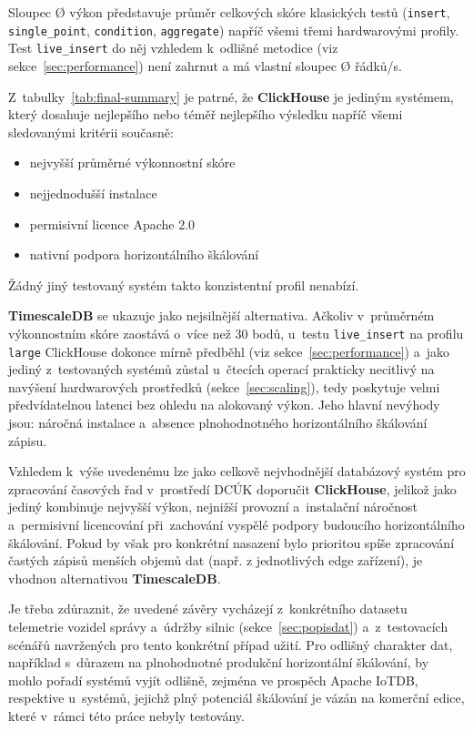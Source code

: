 Sloupec Ø výkon představuje průměr celkových skóre klasických testů (\texttt{insert}, \texttt{single\_point}, \texttt{condition}, \texttt{aggregate}) napříč všemi třemi hardwarovými profily.
Test \texttt{live\_insert} do něj vzhledem k~odlišné metodice 
(viz sekce~\ref{sec:performance}) není zahrnut a má vlastní sloupec Ø řádků/s.

Z~tabulky~\ref{tab:final-summary} je patrné, že \textbf{ClickHouse} je jediným systémem, který dosahuje nejlepšího nebo téměř nejlepšího výsledku napříč všemi sledovanými kritérii současně:
\begin{itemize}
    \item  nejvyšší průměrné výkonnostní skóre
    \item nejjednodušší instalace
    \item permisivní licence Apache 2.0
    \item nativní podpora horizontálního škálování
\end{itemize} 
Žádný jiný testovaný systém takto konzistentní profil nenabízí.

\textbf{TimescaleDB} se ukazuje jako nejsilnější alternativa. 
Ačkoliv v~průměrném výkonnostním skóre zaostává o~více než 30 bodů, u~testu \texttt{live\_insert} na profilu \texttt{large} ClickHouse dokonce mírně předběhl (viz sekce~\ref{sec:performance}) a~jako jediný z~testovaných systémů zůstal u~čtecích operací prakticky necitlivý na navýšení hardwarových prostředků (sekce~\ref{sec:scaling}), tedy poskytuje velmi předvídatelnou latenci bez ohledu na alokovaný výkon. 
Jeho hlavní nevýhody jsou: náročná instalace a~absence plnohodnotného horizontálního škálování zápisu.

Vzhledem k~výše uvedenému lze jako celkově nejvhodnější databázový systém pro zpracování časových řad v~prostředí DCÚK doporučit \textbf{ClickHouse}, jelikož jako jediný kombinuje nejvyšší výkon, nejnižší provozní a~instalační náročnost a~permisivní licencování při~zachování vyspělé podpory budoucího horizontálního škálování. 
Pokud by však pro konkrétní nasazení bylo prioritou spíše zpracování častých zápisů menších objemů dat (např. z jednotlivých edge zařízení), je vhodnou alternativou \textbf{TimescaleDB}.

Je třeba zdůraznit, že uvedené závěry vycházejí z~konkrétního datasetu telemetrie vozidel správy a~údržby silnic (sekce~\ref{sec:popisdat}) a~z~testovacích scénářů navržených pro tento konkrétní případ užití.
Pro odlišný charakter dat, například s~důrazem na plnohodnotné produkční horizontální škálování, by mohlo pořadí systémů vyjít odlišně, zejména ve prospěch Apache IoTDB, respektive u~systémů, jejichž plný potenciál škálování je vázán na komerční edice, které v~rámci této práce nebyly testovány.